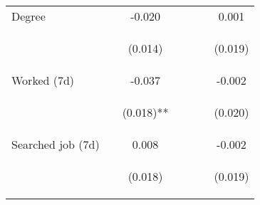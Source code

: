 \begin{tabular}{lcccccc}
\noalign{\smallskip}Degree &  & -0.020 &  &  &  & 0.001\\
 & \begin{footnotesize}\end{footnotesize} & \begin{footnotesize}(0.014)\end{footnotesize} & \begin{footnotesize}\end{footnotesize} & \begin{footnotesize}\end{footnotesize} & \begin{footnotesize}\end{footnotesize} & \begin{footnotesize}(0.019)\end{footnotesize}\\
\noalign{\smallskip}Worked (7d) &  & -0.037 &  &  &  & -0.002\\
 & \begin{footnotesize}\end{footnotesize} & \begin{footnotesize}(0.018)**\end{footnotesize} & \begin{footnotesize}\end{footnotesize} & \begin{footnotesize}\end{footnotesize} & \begin{footnotesize}\end{footnotesize} & \begin{footnotesize}(0.020)\end{footnotesize}\\
\noalign{\smallskip}Searched job (7d) &  & 0.008 &  &  &  & -0.002\\
 & \begin{footnotesize}\end{footnotesize} & \begin{footnotesize}(0.018)\end{footnotesize} & \begin{footnotesize}\end{footnotesize} & \begin{footnotesize}\end{footnotesize} & \begin{footnotesize}\end{footnotesize} & \begin{footnotesize}(0.019)\end{footnotesize}\\

\end{tabular}
